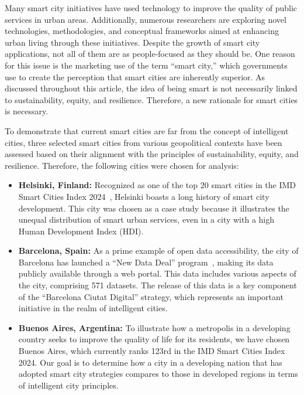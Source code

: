 \documentclass[smartcities,article,submit,pdftex,moreauthors]{Definitions/mdpi}
\begin{document}
Many smart city initiatives have used technology to improve the quality of public services in urban areas. Additionally, numerous researchers are exploring novel technologies, methodologies, and conceptual frameworks aimed at enhancing urban living through these initiatives. Despite the growth of smart city applications, not all of them are as people-focused as they should be. One reason for this issue is the marketing use of the term ``smart city,'' which governments use to create the perception that smart cities are inherently superior. As discussed throughout this article, the idea of being smart is not necessarily linked to sustainability, equity, and resilience. Therefore, a new rationale for smart cities is necessary.  

To demonstrate that current smart cities are far from the concept of intelligent cities, three selected smart cities from various geopolitical contexts have been assessed based on their alignment with the principles of sustainability, equity, and resilience. Therefore, the following cities were chosen for analysis:

\begin{itemize}
    \item \textbf{Helsinki, Finland:} Recognized as one of the top 20 smart cities in the IMD Smart Cities Index 2024~\cite{imd2024}, Helsinki boasts a long history of smart city development. This city was chosen as a case study because it illustrates the unequal distribution of smart urban services, even in a city with a high Human Development Index (HDI).

    \item \textbf{Barcelona, Spain:} As a prime example of open data accessibility, the city of Barcelona has launched a ``New Data Deal'' program~\cite{barcelona_data_deal}, making its data publicly available through a web portal. This data includes various aspects of the city, comprising 571 datasets. The release of this data is a key component of the ``Barcelona Ciutat Digital'' strategy, which represents an important initiative in the realm of intelligent cities.
    
    \item \textbf{Buenos Aires, Argentina:} To illustrate how a metropolis in a developing country seeks to improve the quality of life for its residents, we have chosen Buenos Aires, which currently ranks 123rd in the IMD Smart Cities Index 2024. Our goal is to determine how a city in a developing nation that has adopted smart city strategies compares to those in developed regions in terms of intelligent city principles.

\end{itemize}
\end{document}
